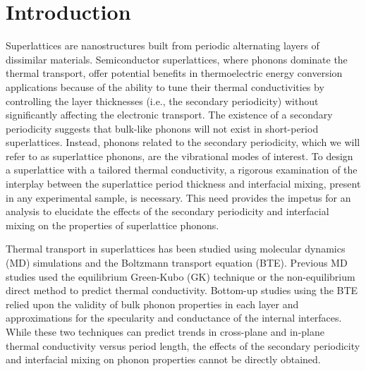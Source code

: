 \documentclass[aps,prb,preprint,preprintnumbers,amsmath,amssymb,floatfix,superscriptaddress]{revtex4}
\begin{document}
\section{Introduction}

Superlattices are nanostructures built from periodic alternating layers of dissimilar materials. Semiconductor superlattices, where phonons dominate the thermal transport, offer potential benefits in thermoelectric energy conversion applications because of the ability to tune their thermal conductivities by controlling the layer thicknesses (i.e., the secondary periodicity) without significantly affecting the electronic transport.\cite{broido1995effect,balandin2003mechanism,kim2006thermal} The existence of a secondary periodicity suggests that bulk-like phonons will not exist in short-period superlattices. Instead, phonons related to the secondary periodicity, which we will refer to as superlattice phonons, are the vibrational modes of interest. To design a superlattice with a tailored thermal conductivity, a rigorous examination of the interplay between the superlattice period thickness and interfacial mixing, present in any experimental sample, is necessary. This need provides the impetus for an analysis to elucidate the effects of the secondary periodicity and interfacial mixing on the properties of superlattice phonons. 

Thermal transport in superlattices has been studied using molecular dynamics (MD) simulations and the Boltzmann transport equation (BTE). Previous MD studies used the equilibrium Green-Kubo (GK) \cite {PhysRevB.85.195302,PhysRevB.77.184302} technique or the non-equilibrium \cite{PhysRevB.77.184302,PhysRevB.79.214307,PhysRevB.72.174302,PhysRevB.79.075316} direct method to predict thermal conductivity. Bottom-up studies using the BTE relied upon the validity of bulk phonon properties in each layer\cite{walkauskas:2579,chen:220} and approximations for the specularity and conductance of the internal interfaces.\cite{PhysRevB.57.14958} While these two techniques can predict trends in cross-plane and in-plane thermal conductivity versus period length, the effects of the secondary periodicity and interfacial mixing on phonon properties cannot be directly obtained.
\end{document}

